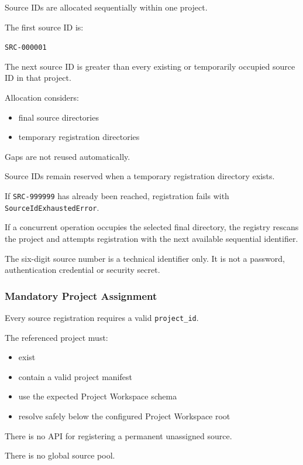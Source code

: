Source IDs are allocated sequentially within one project.

The first source ID is:

\texttt{SRC-000001}

The next source ID is greater than every existing or temporarily occupied source ID in that project.

Allocation considers:

\begin{itemize}
\tightlist
\item
  final source directories
\item
  temporary registration directories
\end{itemize}

Gaps are not reused automatically.

Source IDs remain reserved when a temporary registration directory exists.

If \texttt{SRC-999999} has already been reached, registration fails with \texttt{SourceIdExhaustedError}.

If a concurrent operation occupies the selected final directory, the registry rescans the project and attempts registration with the next available sequential identifier.

The six-digit source number is a technical identifier only. It is not a password, authentication credential or security secret.

\hypertarget{mandatory-project-assignment}{%
\subsubsection{Mandatory Project Assignment}\label{mandatory-project-assignment}}

Every source registration requires a valid \texttt{project\_id}.

The referenced project must:

\begin{itemize}
\tightlist
\item
  exist
\item
  contain a valid project manifest
\item
  use the expected Project Workspace schema
\item
  resolve safely below the configured Project Workspace root
\end{itemize}

There is no API for registering a permanent unassigned source.

There is no global source pool.


